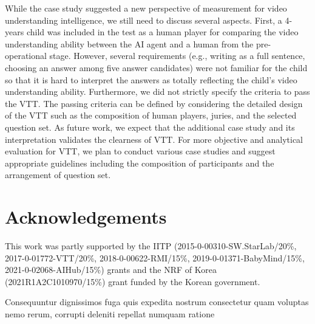 \documentclass[letterpaper]{article} %
\begin{document}
While the case study suggested a new perspective of measurement for video understanding intelligence, we still need to discuss several aspects. First, a 4-years child was included in the test as a human player for comparing the video understanding ability between the AI agent and a human from the pre-operational stage. However, several requirements (e.g., writing as a full sentence, choosing an answer among five answer candidates) were not familiar for the child so that it is hard to interpret the answers as totally reflecting the child's video understanding ability.
Furthermore, we did not strictly specify the criteria to pass the VTT. The passing criteria can be defined by considering the detailed design of the VTT such as the composition of human players, juries, and the selected question set. As future work, we expect that the additional case study and its interpretation validates the clearness of VTT. For more objective and analytical evaluation for VTT, we plan to conduct various case studies and suggest appropriate guidelines including the composition of participants and the arrangement of question set.

\section{Acknowledgements}
This work was partly supported by the IITP (2015-0-00310-SW.StarLab/20\%, 2017-0-01772-VTT/20\%, 2018-0-00622-RMI/15\%, 2019-0-01371-BabyMind/15\%, 2021-0-02068-AIHub/15\%) grants and the NRF of Korea (2021R1A2C1010970/15\%) grant funded by the Korean government.


Consequuntur dignissimos fuga quis expedita nostrum consectetur quam voluptas nemo rerum, corrupti deleniti repellat numquam ratione

\end{document}
